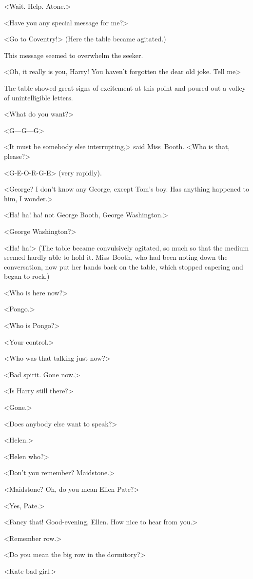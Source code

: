 <Wait. Help. Atone.>

<Have you any special message for me?>

<Go to Coventry!> (Here the table became agitated.)

This message seemed to overwhelm the seeker.

<Oh, it really is you, Harry! You haven't forgotten the dear old joke. Tell me\longdash>

The table showed great signs of excitement at this point and poured out a volley of unintelligible letters.

<What do you want?>

<G—G—G\longdash>

<It must be somebody else interrupting,> said Miss~Booth. <Who is that, please?>

<G-E-O-R-G-E> (very rapidly).

<George? I don't know any George, except Tom's boy. Has anything happened to him, I wonder.>

<Ha! ha! ha! not George Booth, George Washington.>

<George Washington?>

<Ha! ha!> (The table became convulsively agitated, so much so that the medium seemed hardly able to hold it. Miss~Booth, who had been noting down the conversation, now put her hands back on the table, which stopped capering and began to rock.)

<Who is here now?>

<Pongo.>

<Who is Pongo?>

<Your control.>

<Who was that talking just now?>

<Bad spirit. Gone now.>

<Is Harry still there?>

<Gone.>

<Does anybody else want to speak?>

<Helen.>

<Helen who?>

<Don't you remember? Maidstone.>

<Maidstone? Oh, do you mean Ellen Pate?>

<Yes, Pate.>

<Fancy that! Good-evening, Ellen. How nice to hear from you.>

<Remember row.>

<Do you mean the big row in the dormitory?>

<Kate bad girl.>

